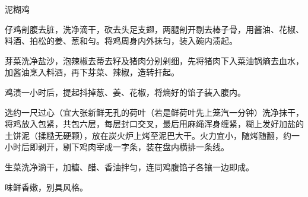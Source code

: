 \begin{recipe}[叫化鸡]{泥糊鸡}

\ingredients




\cooking

\step 仔鸡剖腹去脏，洗净滴干，砍去头足支翅，两腿剖开剔去棒子骨，用酱油、花椒、料酒、拍松的姜、葱和勻。将鸡周身内外抹匀，装入碗内渍起。

\step 芽菜洗净盐沙，泡辣椒去蒂去籽及猪肉分别剁细，先将猪肉下入菜油锅熵去血水，加酱油烹入料酒，再下芽菜、辣椒，造转扞起。

\step 鸡渍一小时后，提起抖掉葱、姜、花椒，将熵好的馅子装入腹内。

\step 选约一尺过心（宜大张新鲜无孔的荷叶（若是鲜荷叶先上笼汽一分钟）洗净抹干，将鸡放入包紧，共包六层，每层封口交叉，最后用麻绳浑身缠紧，糊上发好加盐的土饼泥（揉糙无硬颗），放在炭火炉上烤至泥巴大干。火力宜小，随烤随翻，约一小时后即剥开，剔下鸡肉宰成一字条，装在盘内横排一条线。

\step 生菜洗净滴干，加糖、醋、香油拌匀，连同鸡腹馅子各镶一边即成。

\notes

味鲜香嫩，别具风格。

\end{recipe}

